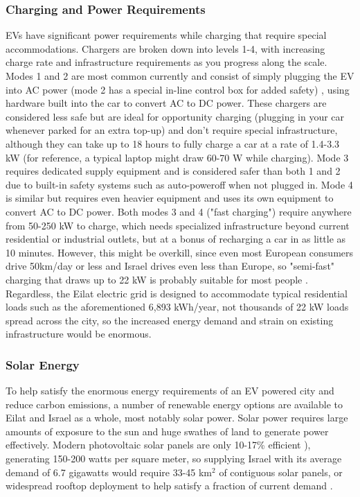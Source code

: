 \documentclass{article}                         %
\begin{document}
\subsubsection{Charging and Power Requirements}
EVs have significant power requirements while charging that require special accommodations. Chargers are broken down into levels 1-4, with increasing charge rate and infrastructure requirements as you progress along the scale. Modes 1 and 2 are most common currently and consist of simply plugging the EV into AC power (mode 2 has a special in-line control box for added safety) \cite{Bossche2010ElectricInfrastructure}, using hardware built into the car to convert AC to DC power. These chargers are considered less safe but are ideal for opportunity charging (plugging in your car whenever parked for an extra top-up) and don't require special infrastructure, although they can take up to 18 hours to fully charge a car at a rate of 1.4-3.3 kW \cite{Ustun2015ImpactSystems} (for reference, a typical laptop might draw 60-70 W while charging). Mode 3 requires dedicated supply equipment and is considered safer than both 1 and 2 due to built-in safety systems such as auto-poweroff when not plugged in. Mode 4 is similar but requires even heavier equipment and uses its own equipment to convert AC to DC power. Both modes 3 and 4 ("fast charging") require anywhere from 50-250 kW \cite{Ustun2015ImpactSystems, Bossche2010ElectricInfrastructure} to charge, which needs specialized infrastructure beyond current residential or industrial outlets, but at a bonus of recharging a car in as little as 10 minutes. However, this might be overkill, since even most European consumers drive 50km/day or less and Israel drives even less than Europe, so "semi-fast" charging that draws up to 22 kW is probably suitable for most people \cite{Bossche2010ElectricInfrastructure}. Regardless, the Eilat electric grid is designed to accommodate typical residential loads such as the aforementioned 6,893 kWh/year, not thousands of 22 kW loads spread across the city, so the increased energy demand and strain on existing infrastructure would be enormous.

\subsubsection{Solar Energy}
To help satisfy the enormous energy requirements of an EV powered city and reduce carbon emissions, a number of renewable energy options are available to Eilat and Israel as a whole, most notably solar power. Solar power requires large amounts of exposure to the sun and huge swathes of land to generate power effectively. Modern photovoltaic solar panels are only 10-17\% efficient \cite{Zhu2015DistributedGrid}), generating 150-200 watts per square meter, so supplying Israel with its average demand of 6.7 gigawatts would require 33-45 km$^2$ of contiguous solar panels, or widespread rooftop deployment to help satisfy a fraction of current demand \cite{Vardimon2011AssessmentIsrael}.
\end{document}
